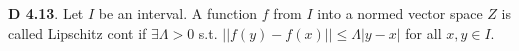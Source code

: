 {\bf D 4.13}. Let $I$ be an interval. A function $f$ from $I$ into a normed vector space $Z$ is called Lipschitz cont if $\exists \Lambda >0$ s.t. $||f(y)-f(x)||\leq \Lambda|y-x|$ for all $x,y \in I$. 
